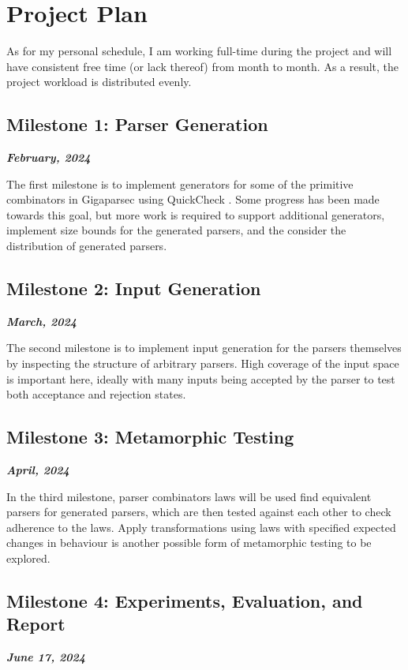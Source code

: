 \documentclass{article}
\newcommand{\be}[1]{\textbf{\emph{#1}}}
\begin{document}
\section{Project Plan} %

As for my personal schedule, I am working full-time during the project and will have consistent free time (or lack thereof) from month to month. As a result, the project workload is distributed evenly.

\subsection{Milestone 1: Parser Generation}
\be{February, 2024}

The first milestone is to implement generators for some of the primitive combinators in Gigaparsec using QuickCheck \cite{quickcheck}. Some progress has been made towards this goal, but more work is required to support additional generators, implement size bounds for the generated parsers, and the consider the distribution of generated parsers.

\subsection{Milestone 2: Input Generation}
\be{March, 2024}

The second milestone is to implement input generation for the parsers themselves by inspecting the structure of arbitrary parsers. High coverage of the input space is important here, ideally with many inputs being accepted by the parser to test both acceptance and rejection states.

\subsection{Milestone 3: Metamorphic Testing}
\be{April, 2024}

In the third milestone, parser combinators laws will be used find equivalent parsers for generated parsers, which are then tested against each other to check adherence to the laws. Apply transformations using laws with specified expected changes in behaviour is another possible form of metamorphic testing to be explored.

\subsection{Milestone 4: Experiments, Evaluation, and Report}
\be{June 17, 2024}
\end{document}
